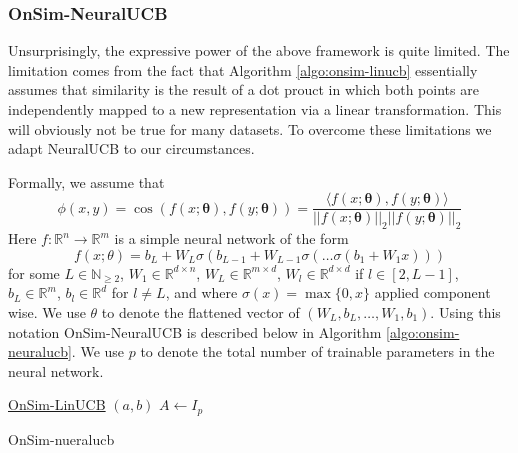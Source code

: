 \documentclass{article}
\begin{document}
\subsubsection{OnSim-NeuralUCB}
Unsurprisingly, the expressive power of the above framework is quite limited.
The limitation comes from the fact that Algorithm \ref{algo:onsim-linucb} essentially assumes that similarity is the result
of a dot prouct in which both points are independently mapped to a new representation via a linear transformation. This will obviously not be true for many datasets.
To overcome these limitations we adapt NeuralUCB \cite{neuralucb} to our circumstances.

Formally, we assume that
\[ \phi(x,y) = \cos\left(f(x;\mathbf{\theta}), f(y;\mathbf{\theta})\right) = \frac{\langle f(x;\mathbf{\theta}), f(y;\mathbf{\theta}) \rangle}{||f(x;\mathbf{\theta})||_2 ||f(y;\mathbf{\theta})||_2}\]
Here $f: \mathbb{R}^n \to \mathbb{R}^m$ is a simple neural network of the form
\[ f(x; \theta) = b_L + W_{L} \sigma\left(b_{L-1} +  W_{L-1} \sigma\left( \dots \sigma\left(b_1 + W_1 x\right)\right) \right)\]
for some $L \in \mathbb{N}_{\geq 2}$, $W_1 \in \mathbb{R}^{d \times n}$, $W_{L} \in \mathbb{R}^{m \times d}$, $W_{l} \in \mathbb{R}^{d\times d}$ if $l \in [2, L-1]$, $b_L \in \mathbb{R}^m$, $b_l \in \mathbb{R}^d$ for $l \neq L$, and where $\sigma(x) = \max\{0, x\}$ applied component wise. We use $\theta$ to denote the flattened vector of $(W_L, b_L, \dots, W_1, b_1)$.
Using this notation OnSim-NeuralUCB is described below in Algorithm \ref{algo:onsim-neuralucb}. We use $p$ to denote the total number of trainable parameters in the neural network.

\begin{algorithm}
  \label{algo:onsim-neuralucb}
    \underline{OnSim-LinUCB} $(a,b)$\;
    $A \gets I_{p}$\;
    \caption{OnSim-nueralucb}
  \end{algorithm}
\end{document}
